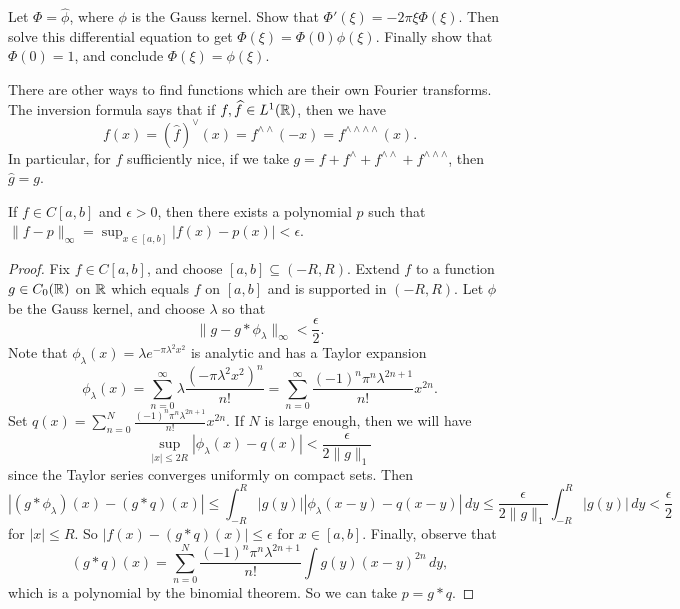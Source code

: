 \begin{exercise}
  Let $\Phi = \widehat{\phi}$, where
  $\phi$ is the Gauss kernel. Show that
  $\Phi'(\xi) = -2\pi \xi \Phi(\xi)$.
  Then solve this differential equation
  to get $\Phi(\xi) = \Phi(0) \phi(\xi)$.
  Finally show that $\Phi(0) = 1$, and
  conclude $\Phi(\xi) = \phi(\xi)$.
\end{exercise}

\begin{remark}
  There are other ways to find functions
  which are their own Fourier transforms.
  The inversion formula says that
  if $f, \widehat{f} \in L^1(\mathbb{R})$,
  then we have
  \[
    f(x)
    = (\widehat{f})^\vee(x)
    = f^{\wedge \wedge}(-x)
    = f^{\wedge \wedge \wedge \wedge}(x).
  \]
  In particular, for $f$ sufficiently
  nice, if we take
  $g = f + f^{\wedge} + f^{\wedge \wedge} + f^{\wedge \wedge \wedge}$,
  then $\widehat{g} = g$.
\end{remark}

\begin{theorem}
  If $f \in C[a, b]$ and $\epsilon > 0$,
  then there exists a polynomial $p$
  such that $\|f - p\|_{\infty} = \sup_{x \in [a, b]} |f(x) - p(x)| < \epsilon$.
\end{theorem}

\begin{proof}
  Fix $f \in C[a, b]$, and choose
  $[a, b] \subseteq (-R, R)$.
  Extend $f$ to a function $g \in C_0(\mathbb{R})$ on
  $\mathbb{R}$ which equals $f$ on $[a, b]$
  and is supported in $(-R, R)$.
  Let $\phi$ be the Gauss kernel, and
  choose $\lambda$ so that
  \[
    \|g - g * \phi_\lambda\|_\infty < \frac{\epsilon}{2}.
  \]
  Note that $\phi_\lambda(x) = \lambda e^{-\pi \lambda^2 x^2}$
  is analytic
  and has a Taylor expansion
  \[
    \phi_{\lambda}(x)
    = \sum_{n = 0}^\infty \lambda \frac{(-\pi \lambda^2 x^2)^n}{n!}
    = \sum_{n = 0}^\infty \frac{(-1)^n \pi^n \lambda^{2n + 1}}{n!} x^{2n}.
  \]
  Set $q(x) = \sum_{n = 0}^N \frac{(-1)^n \pi^n \lambda^{2n + 1}}{n!} x^{2n}$.
  If $N$ is large enough, then we will have
  \[
    \sup_{|x| \le 2R} |\phi_\lambda(x) - q(x)|
    < \frac{\epsilon}{2 \|g\|_1}
  \]
  since the Taylor series converges
  uniformly on compact sets. Then
  \[
    |(g * \phi_\lambda)(x) - (g * q)(x)|
    \le \int_{-R}^R |g(y)| |\phi_{\lambda}(x - y) - q(x - y)| \, dy
    \le \frac{\epsilon}{2\|g\|_1} \int_{-R}^R |g(y)| \, dy
    < \frac{\epsilon}{2}
  \]
  for $|x| \le R$. So
  $|f(x) - (g * q)(x)| \le \epsilon$ for
  $x \in [a, b]$. Finally, observe that
  \[
    (g * q)(x)
    = \sum_{n = 0}^N \frac{(-1)^n \pi^n \lambda^{2n + 1}}{n!} \int g(y) (x - y)^{2n}\, dy,
  \]
  which is a polynomial by the binomial
  theorem. So we can take $p = g * q$.
\end{proof}

